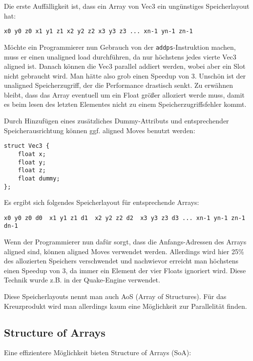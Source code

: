 \documentclass[a4paper,10pt]{article}
\begin{document}
Die erste Auffälligkeit ist, dass ein Array von Vec3 ein ungünstiges Speicherlayout hat:

\begin{verbatim}
x0 y0 z0 x1 y1 z1 x2 y2 z2 x3 y3 z3 ... xn-1 yn-1 zn-1
\end{verbatim}

Möchte ein Programmierer nun Gebrauch von der \texttt{addps}-Instruktion machen, muss er einen
unaligned load durchführen, da nur höchstens jedes vierte Vec3 aligned ist. Danach können die Vec3
parallel addiert werden, wobei aber ein Slot nicht gebraucht wird. Man hätte also grob einen Speedup
von 3. Unschön ist der unaligned Speicherzugriff, der die Performance drastisch senkt. Zu erwähnen
bleibt, dass das Array eventuell um ein Float größer alloziert werde muss, damit es beim lesen des
letzten Elementes nicht zu einem Speicherzugriffsfehler kommt.

Durch Hinzufügen eines zusätzliches Dummy-Attributs und entsprechender Speicherausrichtung können
ggf. aligned Moves benutzt werden:

\begin{verbatim}
struct Vec3 {
    float x;
    float y;
    float z;
    float dummy;
};
\end{verbatim}

Es ergibt sich folgendes Speicherlayout für entsprechende Arrays:

\begin{verbatim}
x0 y0 z0 d0  x1 y1 z1 d1  x2 y2 z2 d2  x3 y3 z3 d3 ... xn-1 yn-1 zn-1 dn-1
\end{verbatim}

Wenn der Programmierer nun dafür sorgt, dass die Anfangs-Adressen des Arrays aligned sind, können
aligned Moves verwendet werden. Allerdings wird hier 25\% des allozierten Speichers verschwendet und
nachwievor erreicht man höchstens einen Speedup von 3, da immer ein Element der vier Floats
ignoriert wird. Diese Technik wurde z.B. in der Quake-Engine verwendet.

Diese Speicherlayouts nennt man auch AoS (Array of Structures). Für das Kreuzprodukt wird man allerdings
kaum eine Möglichkeit zur Parallelität finden.

\subsection{Structure of Arrays}

Eine effizientere Möglichkeit bieten Structure of Arrays (SoA):
\end{document}
